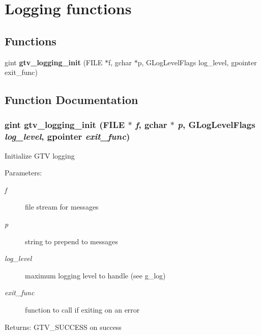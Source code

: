 \section{Logging functions}
\label{group__logging}
\subsection*{Functions}
\begin{CompactItemize}
\item 
gint {\bf gtv\_\-logging\_\-init} (FILE $\ast$f, gchar $\ast$p, GLogLevelFlags log\_\-level, gpointer exit\_\-func)
\end{CompactItemize}


\subsection{Function Documentation}
\subsubsection{\setlength{\rightskip}{0pt plus 5cm}gint gtv\_\-logging\_\-init (FILE $\ast$ {\em f}, gchar $\ast$ {\em p}, GLogLevelFlags {\em log\_\-level}, gpointer {\em exit\_\-func})}\label{group__logging_ga9339a0967e72a04a82cff0fe5777a18}


Initialize GTV logging

\begin{Desc}
\item[Parameters:]
\begin{description}
\item[{\em f}]file stream for messages \item[{\em p}]string to prepend to messages \item[{\em log\_\-level}]maximum logging level to handle (see g\_\-log) \item[{\em exit\_\-func}]function to call if exiting on an error\end{description}
\end{Desc}
\begin{Desc}
\item[Returns:]GTV\_\-SUCCESS on success \end{Desc}

